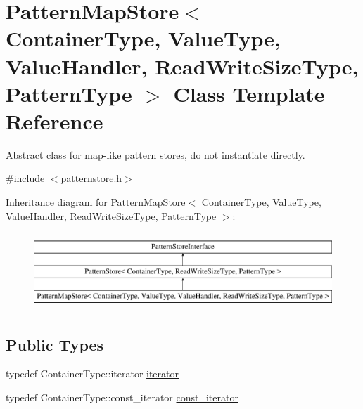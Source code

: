 \hypertarget{classPatternMapStore}{}\section{Pattern\+Map\+Store$<$ Container\+Type, Value\+Type, Value\+Handler, Read\+Write\+Size\+Type, Pattern\+Type $>$ Class Template Reference}
\label{classPatternMapStore}


Abstract class for map-\/like pattern stores, do not instantiate directly.  




{\ttfamily \#include $<$patternstore.\+h$>$}

Inheritance diagram for Pattern\+Map\+Store$<$ Container\+Type, Value\+Type, Value\+Handler, Read\+Write\+Size\+Type, Pattern\+Type $>$\+:\begin{figure}[H]
\begin{center}
\leavevmode
\includegraphics[height=2.921739cm]{classPatternMapStore}
\end{center}
\end{figure}
\subsection*{Public Types}
\begin{DoxyCompactItemize}
\item 
typedef Container\+Type\+::iterator \hyperlink{classPatternMapStore_a4a2ccac9de68d33712dfb1d6e2c0c3a1}{iterator}
\item 
typedef Container\+Type\+::const\+\_\+iterator \hyperlink{classPatternMapStore_a83ae57cc8cb6bf76f5672a0e89684787}{const\+\_\+iterator}
\end{DoxyCompactItemize}
